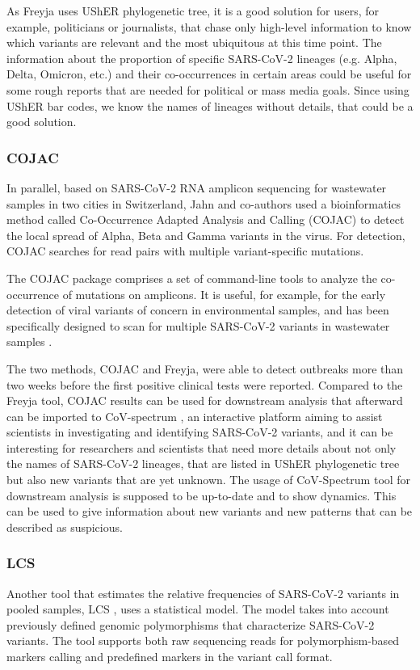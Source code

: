         As Freyja uses UShER phylogenetic tree, it is a good solution for users, for example, politicians or journalists, that chase only high-level information to know which variants are relevant and the most ubiquitous at this time point. The information about the proportion of specific SARS-CoV-2 lineages (e.g. Alpha, Delta, Omicron, etc.) and their co-occurrences in certain areas could be useful for some rough reports that are needed for political or mass media goals. Since using UShER bar codes, we know the names of lineages without details, that could be a good solution. 
        \subsubsection{COJAC}
        In parallel, based on SARS-CoV-2 RNA amplicon sequencing for wastewater samples in two cities in Switzerland, Jahn and co-authors used a bioinformatics method called Co-Occurrence Adapted Analysis and Calling (COJAC) \cite{jahn2022} to detect the local spread of Alpha, Beta and Gamma variants in the virus. For detection, COJAC searches for read pairs with multiple variant-specific mutations. 
        
        The COJAC \cite{jahn2021,jahn2022} package comprises a set of command-line tools to analyze the co-occurrence of mutations on amplicons. It is useful, for example, for the early detection of viral variants of concern in environmental samples, and has been specifically designed to scan for multiple SARS-CoV-2 variants in wastewater samples \cite{cojac2022}.
        
        The two methods, COJAC and Freyja, were able to detect outbreaks more than two weeks before the first positive clinical tests were reported. Compared to the Freyja tool, COJAC results can be used for downstream analysis that afterward can be imported to CoV-spectrum \cite{chen2022b}, an interactive platform aiming to assist scientists in investigating and identifying SARS-CoV-2 variants, and it can be interesting for researchers and scientists that need more details about not only the names of SARS-CoV-2 lineages, that are listed in UShER phylogenetic tree but also new variants that are yet unknown. The usage of CoV-Spectrum tool for downstream analysis is supposed to be up-to-date and to show dynamics. This can be used to give information about new variants and new patterns that can be described as suspicious.
        \subsubsection{LCS}
        Another tool that estimates the relative frequencies of SARS-CoV-2 variants in pooled samples, LCS \cite{valieris2022}, uses a statistical model. The model takes into account previously defined genomic polymorphisms that characterize SARS-CoV-2 variants. The tool supports both raw sequencing reads for polymorphism-based markers calling and predefined markers in the variant call format.
